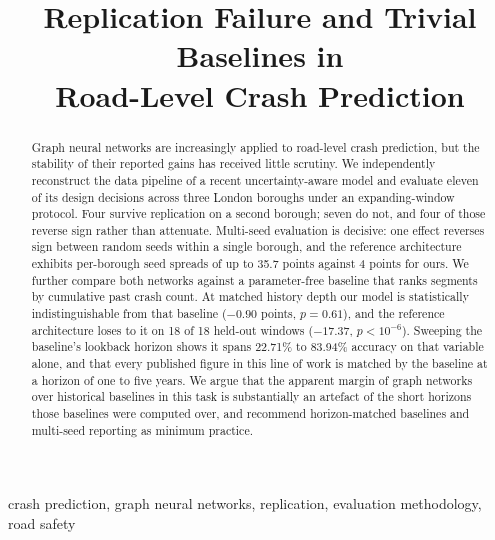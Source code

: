 \documentclass[conference]{IEEEtran}
\begin{document}
\title{Replication Failure and Trivial Baselines in\\
Road-Level Crash Prediction}

\author{
}

\maketitle

\begin{abstract}
Graph neural networks are increasingly applied to road-level crash
prediction, but the stability of their reported gains has received little
scrutiny. We independently reconstruct the data pipeline of a recent
uncertainty-aware model and evaluate eleven of its design decisions across
three London boroughs under an expanding-window protocol. Four survive
replication on a second borough; seven do not, and four of those reverse
sign rather than attenuate. Multi-seed evaluation is decisive: one effect
reverses sign between random seeds within a single borough, and the
reference architecture exhibits per-borough seed spreads of up to 35.7
points against 4 points for ours. We further compare both networks against
a parameter-free baseline that ranks segments by cumulative past crash
count. At matched history depth our model is statistically
indistinguishable from that baseline ($-0.90$ points, $p=0.61$), and the
reference architecture loses to it on 18 of 18 held-out windows
($-17.37$, $p<10^{-6}$). Sweeping the baseline's lookback horizon shows it
spans 22.71\% to 83.94\% accuracy on that variable alone, and that every
published figure in this line of work is matched by the baseline at a
horizon of one to five years. We argue that the apparent margin of graph
networks over historical baselines in this task is substantially an
artefact of the short horizons those baselines were computed over, and
recommend horizon-matched baselines and multi-seed reporting as minimum
practice.
\end{abstract}

\begin{IEEEkeywords}
crash prediction, graph neural networks, replication, evaluation
methodology, road safety
\end{IEEEkeywords}
\end{document}
